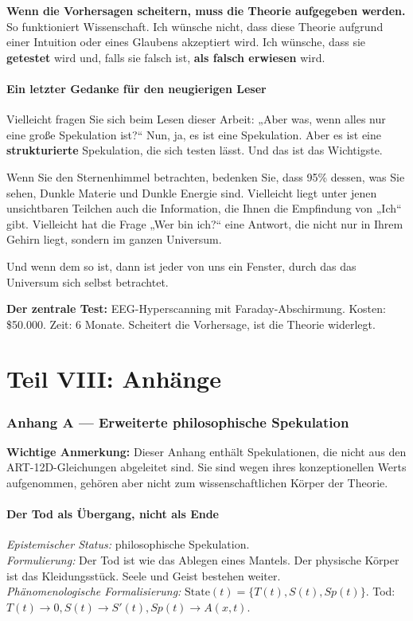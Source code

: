 \documentclass[11pt,a4paper]{article}
\begin{document}
\textbf{Wenn die Vorhersagen scheitern, muss die Theorie aufgegeben werden.} So funktioniert Wissenschaft. Ich wünsche nicht, dass diese Theorie aufgrund einer Intuition oder eines Glaubens akzeptiert wird. Ich wünsche, dass sie \textbf{getestet} wird und, falls sie falsch ist, \textbf{als falsch erwiesen} wird.

\subsection{Ein letzter Gedanke für den neugierigen Leser}
Vielleicht fragen Sie sich beim Lesen dieser Arbeit: „Aber was, wenn alles nur eine große Spekulation ist?`` Nun, ja, es ist eine Spekulation. Aber es ist eine \textbf{strukturierte} Spekulation, die sich testen lässt. Und das ist das Wichtigste.

Wenn Sie den Sternenhimmel betrachten, bedenken Sie, dass 95\% dessen, was Sie sehen, Dunkle Materie und Dunkle Energie sind. Vielleicht liegt unter jenen unsichtbaren Teilchen auch die Information, die Ihnen die Empfindung von „Ich`` gibt. Vielleicht hat die Frage „Wer bin ich?`` eine Antwort, die nicht nur in Ihrem Gehirn liegt, sondern im ganzen Universum.

Und wenn dem so ist, dann ist jeder von uns ein Fenster, durch das das Universum sich selbst betrachtet.

\textbf{Der zentrale Test:} EEG-Hyperscanning mit Faraday-Abschirmung. Kosten: \$50.000. Zeit: 6 Monate. Scheitert die Vorhersage, ist die Theorie widerlegt.

\newpage
\part*{Teil VIII: Anhänge}

\section{Anhang A --- Erweiterte philosophische Spekulation}
\textbf{Wichtige Anmerkung:} Dieser Anhang enthält Spekulationen, die nicht aus den ART-12D-Gleichungen abgeleitet sind. Sie sind wegen ihres konzeptionellen Werts aufgenommen, gehören aber nicht zum wissenschaftlichen Körper der Theorie.

\subsection{Der Tod als Übergang, nicht als Ende}
\textit{Epistemischer Status:} philosophische Spekulation. \\
\textit{Formulierung:} Der Tod ist wie das Ablegen eines Mantels. Der physische Körper ist das Kleidungsstück. Seele und Geist bestehen weiter. \\
\textit{Phänomenologische Formalisierung:} $\text{State}(t) = \{ T(t), S(t), Sp(t) \}$. Tod: $T(t) \to 0, S(t) \to S'(t), Sp(t) \to A(x,t)$.
\end{document}

